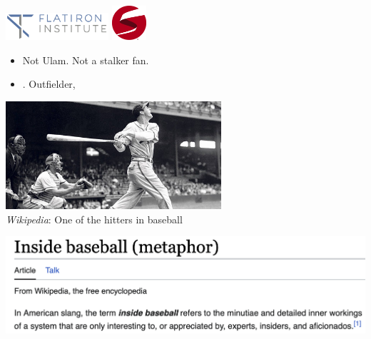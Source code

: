 \documentclass[9pt]{report}
\begin{document}
\sf%
\mbox{ }
\\[12pt]
\spc{{\LARGE\bfseries \color{MidnightBlue}{Orders of Magnitude:}}}
\\[8pt]
\spc{\Large\bfseries \color{MidnightBlue}{Stan Algorithms and Engineering}}
\\[36pt]
\noindent 
\spc{\large\bfseries \color{MidnightBlue}{Bob Carpenter}}
\\[2pt]
\\[2pt]
\vfill 
\noindent 
{}
\hfill
\includegraphics[width=1.5in]{img/flatiron_logo.png}
\includegraphics[width=0.5in]{img/stan-logo.png}

\begin{itemize}
\item Not Ulam. Not a stalker fan.
\item {}.  Outfielder, 
\end{itemize}
\begin{center}
  \spc\includegraphics[width=0.6\textwidth]{img/stan-the-man.jpeg}
  \\
  {\small {\slshape Wikipedia}: One of the  hitters in baseball}
  \end{center}


\sld{}
\begin{center}
    \spc\includegraphics[width=\textwidth]{img/inside-baseball.png}
\end{center}
\end{document}
